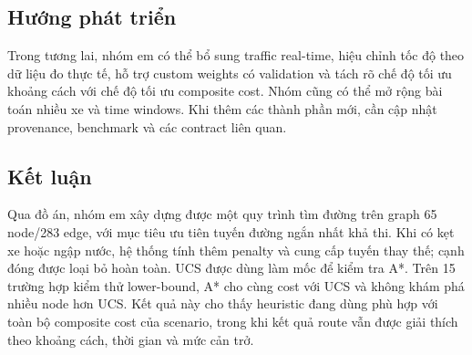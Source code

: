 \subsection{Hướng phát triển}
Trong tương lai, nhóm em có thể bổ sung traffic real-time, hiệu chỉnh tốc độ theo dữ liệu đo thực tế, hỗ trợ custom weights có validation và tách rõ chế độ tối ưu khoảng cách với chế độ tối ưu composite cost. Nhóm cũng có thể mở rộng bài toán nhiều xe và time windows. Khi thêm các thành phần mới, cần cập nhật provenance, benchmark và các contract liên quan.

\subsection{Kết luận}
Qua đồ án, nhóm em xây dựng được một quy trình tìm đường trên graph 65 node/283 edge, với mục tiêu ưu tiên tuyến đường ngắn nhất khả thi. Khi có kẹt xe hoặc ngập nước, hệ thống tính thêm penalty và cung cấp tuyến thay thế; cạnh đóng được loại bỏ hoàn toàn. UCS được dùng làm mốc để kiểm tra A*. Trên 15 trường hợp kiểm thử lower-bound, A* cho cùng cost với UCS và không khám phá nhiều node hơn UCS. Kết quả này cho thấy heuristic đang dùng phù hợp với toàn bộ composite cost của scenario, trong khi kết quả route vẫn được giải thích theo khoảng cách, thời gian và mức cản trở.
